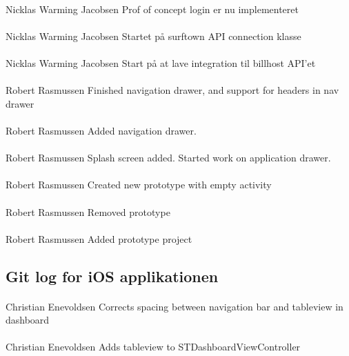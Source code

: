 \documentclass[12pt]{article}
\begin{document}
\paragraph{}Nicklas Warming Jacobsen	Prof of concept login er nu implementeret
\paragraph{}Nicklas Warming Jacobsen	Startet på surftown API connection klasse
\paragraph{}Nicklas Warming Jacobsen	Start på at lave integration til billhost API'et
\paragraph{}Robert Rasmussen	Finished navigation drawer, and support for headers in nav drawer
\paragraph{}Robert Rasmussen	Added navigation drawer.
\paragraph{}Robert Rasmussen	Splash screen added. Started work on application drawer.
\paragraph{}Robert Rasmussen	Created new prototype with empty activity
\paragraph{}Robert Rasmussen	Removed prototype
\paragraph{}Robert Rasmussen	Added prototype project
\subsection{Git log for iOS applikationen}
\paragraph{}Christian Enevoldsen	Corrects spacing between navigation bar and tableview in dashboard
\paragraph{}Christian Enevoldsen	Adds tableview to STDashboardViewController
\end{document}

